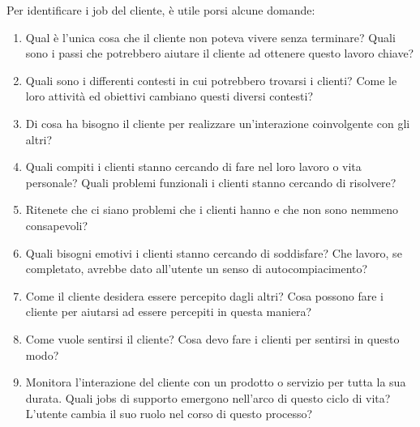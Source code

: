 Per identificare i job del cliente, è utile porsi alcune domande:
\begin{enumerate}
    \item Qual è l'unica cosa che il cliente non poteva vivere senza terminare? Quali sono i passi che potrebbero aiutare il cliente ad ottenere questo lavoro chiave?
    \item Quali sono i differenti contesti in cui potrebbero trovarsi i clienti? Come le loro attività ed obiettivi cambiano questi diversi contesti?
    \item Di cosa ha bisogno il cliente per realizzare un'interazione coinvolgente con gli altri?
    \item Quali compiti i clienti stanno cercando di fare nel loro lavoro o vita personale? Quali problemi funzionali i clienti stanno cercando di risolvere?
    \item Ritenete che ci siano problemi che i clienti hanno e che non sono nemmeno consapevoli?
    \item Quali bisogni emotivi i clienti stanno cercando di soddisfare? Che lavoro, se completato, avrebbe dato all'utente un senso di autocompiacimento?
    \item Come il cliente desidera essere percepito dagli altri? Cosa possono fare i cliente per aiutarsi ad essere percepiti in questa maniera?
    \item Come vuole sentirsi il cliente? Cosa devo fare i clienti per sentirsi in questo modo?
    \item Monitora l'interazione del cliente con un prodotto o servizio per tutta la sua durata. Quali jobs di supporto emergono nell'arco di questo ciclo di vita? L'utente cambia il suo ruolo nel corso di questo processo?
\end{enumerate}

